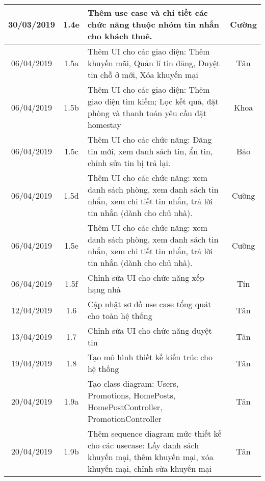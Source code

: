 \begin{center}
\begin{longtable}{ | c | c | p{5cm} |c|}
		30/03/2019 & 1.4e & Thêm use case và chi tiết các chức năng thuộc nhóm tin nhắn cho khách thuê. & Cường \\ \hline
		
		06/04/2019 & 1.5a & Thêm UI cho các giao diện: Thêm khuyến mãi, Quản lí tin đăng, Duyệt tin chỗ ở mới, Xóa khuyến mại & Tân \\ \hline 
		06/04/2019 & 1.5b & Thêm UI cho các giao diện: Thêm giao diện tìm kiếm; Lọc kết quả, đặt phòng và thanh toán yêu cầu đặt homestay & Khoa \\ \hline
		06/04/2019 & 1.5c & Thêm UI cho các chức năng: Đăng tin mới, xem danh sách tin, ẩn tin, chỉnh sửa tin bị trả lại. & Bảo \\ \hline
		06/04/2019 & 1.5d & Thêm UI cho các chức năng: xem danh sách phòng, xem danh sách tin nhắn, xem chi tiết tin nhắn, trả lời tin nhắn (dành cho chủ nhà). & Cường \\ \hline
		06/04/2019 & 1.5e & Thêm UI cho các chức năng: xem danh sách phòng, xem danh sách tin nhắn, xem chi tiết tin nhắn, trả lời tin nhắn (dành cho chủ nhà). & Cường \\ \hline
		06/04/2019 & 1.5f & Chỉnh sửa UI cho chức năng xếp hạng nhà & Tín \\ \hline
		12/04/2019 & 1.6 & Cập nhật sơ đồ use case tổng quát cho toàn hệ thống & Tân \\ \hline
		13/04/2019 & 1.7 & Chỉnh sửa UI cho chức năng duyệt tin & Tân \\ \hline
		19/04/2019 & 1.8 & Tạo mô hình thiết kế kiến trúc cho hệ thống & Tân \\ \hline
		20/04/2019 & 1.9a & Tạo class diagram: Users, Promotions, HomePosts, HomePostController, PromotionController & Tân \\ \hline
		20/04/2019 & 1.9b & Thêm sequence diagram mức thiết kế cho các usecase: Lấy danh sách khuyến mại, thêm khuyến mại, xóa khuyến mại, chỉnh sửa khuyến mại & Tân \\ \hline
		\end{longtable}
\end{center}